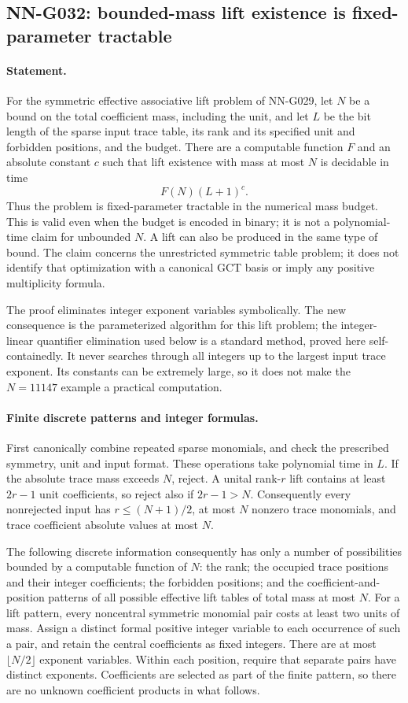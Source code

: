 \subsection{NN-G032: bounded-mass lift existence is fixed-parameter tractable}
\paragraph{Statement.}
For the symmetric effective associative lift problem of NN-G029,
let $N$ be a bound on the total coefficient mass, including
the unit, and let $L$ be the bit length of the sparse input
trace table, its rank and its specified unit and forbidden
positions, and the budget. There are a computable function
$F$ and an absolute constant $c$ such that lift existence
with mass at most $N$ is decidable in time
\[
                    F(N)(L+1)^c.                  \tag{G032.1}
\]
Thus the problem is fixed-parameter tractable in the numerical
mass budget. This is valid even when the budget is encoded
in binary; it is not a polynomial-time claim for unbounded
$N$. A lift can also be produced in the same type of bound.
The claim concerns the unrestricted symmetric table problem;
it does not identify that optimization with a canonical GCT
basis or imply any positive multiplicity formula.

The proof eliminates integer exponent variables symbolically.
The new consequence is the parameterized algorithm for this
lift problem; the integer-linear quantifier elimination used
below is a standard method, proved here self-containedly.
It never searches through all integers up to the largest input
trace exponent. Its constants can be extremely large, so it
does not make the $N=11147$ example a practical computation.

\paragraph{Finite discrete patterns and integer formulas.}
First canonically combine repeated sparse monomials, and
check the prescribed symmetry, unit and input format. These
operations take polynomial time in $L$. If the absolute trace
mass exceeds $N$, reject. A unital rank-$r$ lift contains at
least $2r-1$ unit coefficients, so reject also if $2r-1>N$.
Consequently every nonrejected input has $r\le(N+1)/2$,
at most $N$ nonzero trace monomials, and trace coefficient
absolute values at most $N$.

The following discrete information consequently has only
a number of possibilities bounded by a computable function
of $N$: the rank; the occupied trace positions and their
integer coefficients; the forbidden positions; and the
coefficient-and-position patterns of all possible effective
lift tables of total mass at most $N$.
For a lift pattern, every noncentral symmetric monomial pair
costs at least two units of mass. Assign a distinct formal
positive integer variable to each occurrence of such a pair,
and retain the central coefficients as fixed integers.
There are at most $\lfloor N/2\rfloor$ exponent variables.
Within each position, require that separate pairs have
distinct exponents. Coefficients are selected as part of
the finite pattern, so there are no unknown coefficient
products in what follows.

